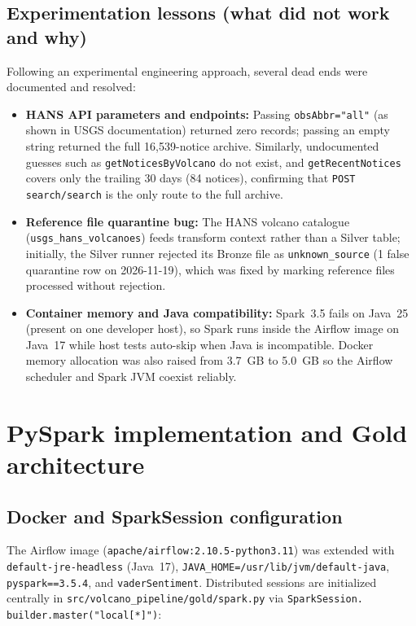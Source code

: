 \documentclass[11pt,a4paper]{article}
\begin{document}
\subsection{Experimentation lessons (what did not work and why)}
Following an experimental engineering approach, several dead ends were documented and resolved:
\begin{itemize}
  \item \textbf{HANS API parameters and endpoints:} Passing \texttt{obsAbbr="all"} (as shown in USGS documentation) returned zero records; passing an empty string returned the full 16,539-notice archive. Similarly, undocumented guesses such as \texttt{getNoticesByVolcano} do not exist, and \texttt{getRecentNotices} covers only the trailing 30 days (84 notices), confirming that \texttt{POST search/search} is the only route to the full archive.
  \item \textbf{Reference file quarantine bug:} The HANS volcano catalogue (\texttt{usgs\_hans\_volcanoes}) feeds transform context rather than a Silver table; initially, the Silver runner rejected its Bronze file as \texttt{unknown\_source} (1 false quarantine row on 2026-11-19), which was fixed by marking reference files processed without rejection.
  \item \textbf{Container memory and Java compatibility:} Spark~3.5 fails on Java~25 (present on one developer host), so Spark runs inside the Airflow image on Java~17 while host tests auto-skip when Java is incompatible. Docker memory allocation was also raised from 3.7~GB to 5.0~GB so the Airflow scheduler and Spark JVM coexist reliably.
\end{itemize}

\section{PySpark implementation and Gold architecture}\label{sec:pyspark}

\subsection{Docker and SparkSession configuration}
The Airflow image (\texttt{apache/airflow:2.10.5-python3.11}) was extended with \texttt{default-jre-headless} (Java~17), \texttt{JAVA\_HOME=/usr/lib/jvm/default-java}, \texttt{pyspark==3.5.4}, and \texttt{vaderSentiment}. Distributed sessions are initialized centrally in \texttt{src/volcano\_pipeline/gold/spark.py} via \texttt{SparkSession. builder.master("local[*]")}:
\end{document}
